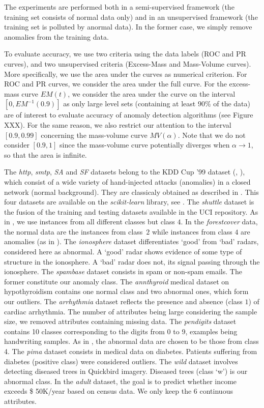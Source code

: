The experiments are performed both in a semi-supervised framework (the training set consists of normal data only) and in an unsupervised framework (the training set is polluted by anormal data).
In the former case, we simply remove anomalies from the training data.

To evaluate accuracy, we use two criteria using the data labels (ROC and PR curves), and two unsupervised criteria (Excess-Mass and Mass-Volume curves).
More specifically, we use the area under the curves as numerical criterion. For ROC and PR curves, we consider the area under the full curve. For the excess-mass curve $EM(t)$, we consider the area under the curve on the interval $[0, EM^{-1}(0.9)]$ as only large level sets (containing at least $90\%$ of the data) are of interest to evaluate accuracy of anomaly detection algorithms (see Figure XXX).
For the same reason, we also restrict our attention to the interval $[0.9, 0.99]$ concerning the mass-volume curve $MV(\alpha)$. Note that we do not consider $[0.9, 1]$ since the mass-volume curve potentially diverges when $\alpha \to 1$, so that the area is infinite.

The \emph{http}, \emph{smtp}, \emph{SA} and \emph{SF} datasets belong to the KDD Cup '99 dataset (\cite{KDD99}, \cite{Tavallaee2009}), which consist of a wide variety of hand-injected  attacks (anomalies) in a closed network (normal background). They are classicaly obtained as described in \cite{Yamanishi2000}. This four datasets are available on the \emph{scikit-learn} library, see \cite{sklearn2011}.
The \emph{shuttle} dataset is the fusion of the training and testing datasets available in the UCI repository. As in \cite{Liu2008}, we use instances from all different classes but class $4$.%
In the \emph{forestcover} data, the normal data are the instances from class~$2$ while instances from class $4$ are anomalies (as in \cite{Liu2008}). %
The \emph{ionosphere} dataset differentiates `good' from `bad' radars, considered here as abnormal. A `good' radar shows evidence of some type of structure in the ionosphere. A `bad' radar does not, its signal passing through the ionosphere.
The \emph{spambase} dataset consists in spam or non-spam emails. The former constitute our anomaly class.
The \emph{annthyroid} medical dataset on hypothyroidism contains one normal class and two abnormal ones, which form our outliers.
The \emph{arrhythmia} dataset reflects the presence and absence (class $1$) of cardiac arrhythmia. The number of attributes being large considering the sample size, we removed attributes containing missing data.
The \emph{pendigits} dataset contains 10 classes corresponding to the digits from 0 to 9, examples being handwriting samples. As in \cite{Schubert2012}, the abnormal data are chosen to be those from class 4.
The \emph{pima} dataset consists in medical data on diabetes. Patients suffering from diabetes (positive class) were considered outliers.
The \emph{wild} dataset involves detecting diseased trees in Quickbird imagery. Diseased trees (class `w') is our abnormal class.
In the \emph{adult} dataset, the goal is to predict whether income exceeds \$ 50K/year based on census data. We only keep the 6 continuous attributes.


